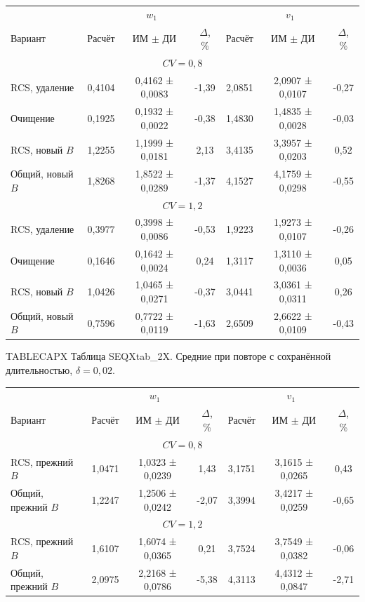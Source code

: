 \setlength{\tabcolsep}{3pt}
\begin{tabular}{lcccccc}
\toprule
 & \multicolumn{3}{c}{$w_1$} & \multicolumn{3}{c}{$v_1$} \\
Вариант & Расчёт & ИМ $\pm$ ДИ & $\Delta$, \% & Расчёт & ИМ $\pm$ ДИ & $\Delta$, \% \\
\midrule
\multicolumn{7}{c}{$CV=0,8$} \\
RCS, удаление & 0,4104 & 0,4162 ± 0,0083 & -1,39 & 2,0851 & 2,0907 ± 0,0107 & -0,27 \\
Очищение & 0,1925 & 0,1932 ± 0,0022 & -0,38 & 1,4830 & 1,4835 ± 0,0028 & -0,03 \\
RCS, новый $B$ & 1,2255 & 1,1999 ± 0,0181 & 2,13 & 3,4135 & 3,3957 ± 0,0203 & 0,52 \\
Общий, новый $B$ & 1,8268 & 1,8522 ± 0,0289 & -1,37 & 4,1527 & 4,1759 ± 0,0298 & -0,55 \\
\multicolumn{7}{c}{$CV=1,2$} \\
RCS, удаление & 0,3977 & 0,3998 ± 0,0086 & -0,53 & 1,9223 & 1,9273 ± 0,0107 & -0,26 \\
Очищение & 0,1646 & 0,1642 ± 0,0024 & 0,24 & 1,3117 & 1,3110 ± 0,0036 & 0,05 \\
RCS, новый $B$ & 1,0426 & 1,0465 ± 0,0271 & -0,37 & 3,0441 & 3,0361 ± 0,0311 & 0,26 \\
Общий, новый $B$ & 0,7596 & 0,7722 ± 0,0119 & -1,63 & 2,6509 & 2,6622 ± 0,0109 & -0,43 \\
\bottomrule
\end{tabular}




\noindent TABLECAPX Таблица SEQXtab_2X. Средние при повторе с сохранённой длительностью, $\delta=0{,}02$.\par

\setlength{\tabcolsep}{3pt}
\begin{tabular}{lcccccc}
\toprule
 & \multicolumn{3}{c}{$w_1$} & \multicolumn{3}{c}{$v_1$} \\
Вариант & Расчёт & ИМ $\pm$ ДИ & $\Delta$, \% & Расчёт & ИМ $\pm$ ДИ & $\Delta$, \% \\
\midrule
\multicolumn{7}{c}{$CV=0,8$} \\
RCS, прежний $B$ & 1,0471 & 1,0323 ± 0,0239 & 1,43 & 3,1751 & 3,1615 ± 0,0265 & 0,43 \\
Общий, прежний $B$ & 1,2247 & 1,2506 ± 0,0242 & -2,07 & 3,3994 & 3,4217 ± 0,0259 & -0,65 \\
\multicolumn{7}{c}{$CV=1,2$} \\
RCS, прежний $B$ & 1,6107 & 1,6074 ± 0,0365 & 0,21 & 3,7524 & 3,7549 ± 0,0382 & -0,06 \\
Общий, прежний $B$ & 2,0975 & 2,2168 ± 0,0786 & -5,38 & 4,3113 & 4,4312 ± 0,0847 & -2,71 \\
\bottomrule
\end{tabular}




